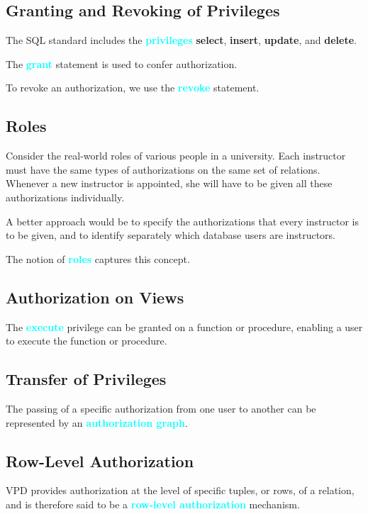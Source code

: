 \documentclass[a4paper,12pt,twoside,openany]{book}
\newcommand{\textcy}[1]{\textbf{\textcolor{cyan}{#1}}}
\begin{document}
\subsection{Granting and Revoking of Privileges}

The SQL standard includes the \textcy{privileges} \textbf{select}, \textbf{insert}, \textbf{update}, and \textbf{delete}.

The \textcy{grant} statement is used to confer authorization.

To revoke an authorization, we use the \textcy{revoke} statement.

\subsection{Roles}

Consider the real-world roles of various people in a university. Each instructor must have the same types of authorizations on the same set of relations. Whenever a new instructor is appointed, she will have to be given all these authorizations individually.

A better approach would be to specify the authorizations that every instructor is to be given, and to identify separately which database users are instructors.

The notion of \textcy{roles} captures this concept.

\subsection{Authorization on Views}

The \textcy{execute} privilege can be granted on a function or procedure, enabling a user to execute the function or procedure.

\subsection{Transfer of Privileges}

The passing of a specific authorization from one user to another can be represented by an \textcy{authorization graph}.

\subsection{Row-Level Authorization}

VPD provides authorization at the level of specific tuples, or rows, of a relation, and is therefore said to be a \textcy{row-level authorization} mechanism.

\end{document}
